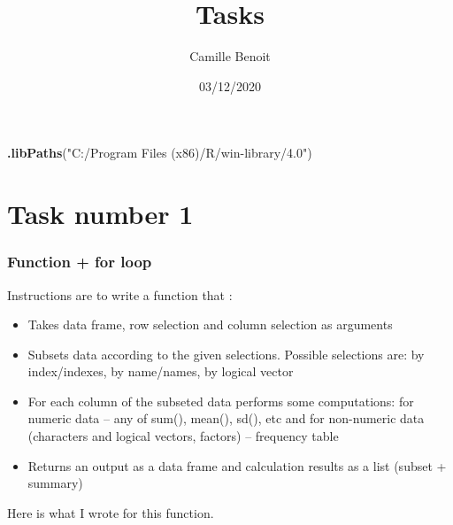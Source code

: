 \documentclass[
]{article}
\title{Tasks}
\author{Camille Benoit}
\date{03/12/2020}
\newenvironment{Shaded}{\begin{snugshade}}{\end{snugshade}}
\newcommand{\KeywordTok}[1]{\textcolor[rgb]{0.13,0.29,0.53}{\textbf{#1}}}
\newcommand{\NormalTok}[1]{#1}
\newcommand{\StringTok}[1]{\textcolor[rgb]{0.31,0.60,0.02}{#1}}
\begin{document}
\maketitle

\begin{Shaded}
\begin{Highlighting}[]
\KeywordTok{.libPaths}\NormalTok{(}\StringTok{"C:/Program Files (x86)/R/win-library/4.0"}\NormalTok{)}
\end{Highlighting}
\end{Shaded}

\hypertarget{task-number-1}{%
\section{Task number 1}\label{task-number-1}}

\hypertarget{function-for-loop}{%
\subsubsection{Function + for loop}\label{function-for-loop}}

Instructions are to write a function that :

\begin{itemize}
\item
  Takes data frame, row selection and column selection as arguments
\item
  Subsets data according to the given selections. Possible selections
  are: by index/indexes, by name/names, by logical vector
\item
  For each column of the subseted data performs some computations: for
  numeric data -- any of sum(), mean(), sd(), etc and for non-numeric
  data (characters and logical vectors, factors) -- frequency table
\item
  Returns an output as a data frame and calculation results as a list
  (subset + summary)
\end{itemize}

Here is what I wrote for this function.
\end{document}
